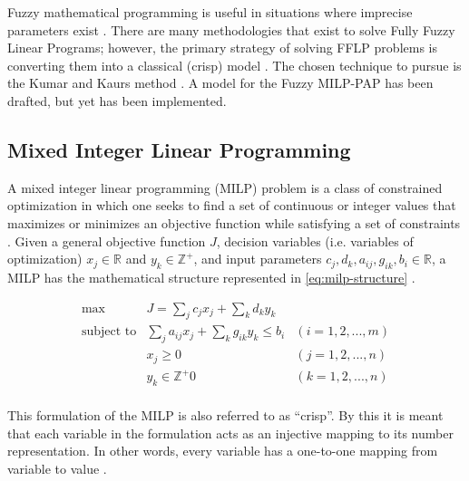 \documentclass[ee,msthesis]{usuthesis}
\begin{document}
Fuzzy mathematical programming is useful in situations where imprecise parameters exist \cite{bello-2019-fuzzy-activ}.
There are many methodologies that exist to solve Fully Fuzzy Linear Programs; however, the primary strategy of solving
FFLP problems is converting them into a classical (crisp) model
\cite{bello-2019-fuzzy-activ,nasseri-2013-fully,kaur-2016-introd-fuzzy}. The chosen technique to pursue is the Kumar
and Kaurs method \cite{kaur-2016-introd-fuzzy}. A model for the Fuzzy MILP-PAP has been drafted, but yet has been
implemented.

\subsection{Mixed Integer Linear Programming}
\label{sec:org5348995}
A mixed integer linear programming (MILP) problem is a class of constrained optimization in which one seeks to find a
set of continuous or integer values that maximizes or minimizes an objective function while satisfying a set of
constraints \cite{chen-2010-applied}. Given a general objective function \(J\), decision variables (i.e. variables of
optimization) \(x_j \in \mathbb{R}\) and \(y_k \in \mathbb{Z}^+\), and input parameters \(c_j, d_k, a_{ij}, g_{ik}, b_i \in \mathbb{R}\), a MILP has the
mathematical structure represented in \ref{eq:milp-structure} \cite{chen-2010-applied}.

\begin{equation}
\label{eq:milp-structure}
\begin{array}{lll}
\text{max}   & J = \sum_j c_j x_j + \sum_k d_k y_k            &                 \\
\text{subject to} & \sum_j a_{ij} x_j + \sum_k g_{ik} y_k  \le b_i & (i = 1,2,...,m) \\
                  & x_j \ge 0                                      & (j = 1,2,...,n) \\
                  & y_k \in \mathbb{Z^+}0                          & (k = 1,2,...,n) \\
\end{array}
\end{equation}

This formulation of the MILP is also referred to as ``crisp''. By this it is meant that each variable in the formulation
acts as an injective mapping to its number representation. In other words, every variable has a one-to-one mapping from
variable to value \cite{kaur-2016-introd-fuzzy}.
\end{document}
